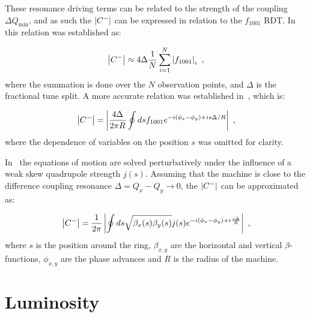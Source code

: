 These resonance driving terms can be related to the strength of the coupling \(\Delta Q_{\mathrm{min}}\), and as such the \(\left\lvert C^{-} \right\rvert\) can be expressed in relation to the \(f_{1001}\) RDT.
In~\cite{PHD:Franchi} this relation was established as:

\begin{equation}
    \left\lvert C^{-} \right\rvert \approx 4 \Delta \frac{1}{N} \sum_{i=1}^N \left\lvert f_{1001} \right\rvert_i \text{ ,}
    \label{equation:deltaqmin_from_f1001_franchi}
\end{equation}
where the summation is done over the \(N\) observation points, and \(\Delta\) is the fractional tune split.
A more accurate relation was established in~\cite{PRAB:Persson:Improved_Control_Betatron_Coupling}, which is:

\begin{equation}
    \left\lvert C^{-} \right\rvert = \left\lvert \frac{4 \Delta}{2 \pi R} \oint d s f_{1001} e^{-i \left(\phi_x - \phi_y \right) + i s \Delta / R}  \right\rvert \text{ ,}
    \label{equation:deltaqmin_from_f1001}
\end{equation}
where the dependence of variables on the position \(s\) was omitted for clarity.

In~\cite{PHREV:Guignard:Betatron_Coupling_Radiation} the equations of motion are solved perturbatively under the influence of a weak skew quadrupole strength \(j(s)\).
Assuming that the machine is close to the difference coupling resonance \(\Delta = Q_x - Q_y \rightarrow 0\), the \(\left\lvert C^{-} \right\rvert\) can be approximated as:

\begin{equation}
    \left\lvert C^{-} \right\rvert = \frac{1}{2 \pi} \left\lvert  \oint ds \sqrt{\beta_x(s) \beta_y(s)} j(s) e^{-i \left( \phi_x - \phi_y \right) + i \frac{s \Delta}{R}}  \right\rvert \text{ ,}
    \label{equation:deltaqmin_guignard}
\end{equation}
where \(s\) is the position around the ring, \(\beta_{x,y}\) are the horizontal and vertical \(\beta\)-functions, \(\phi_{x,y}\) are the phase advances and \(R\) is the radius of the machine.



\section{Luminosity}
\label{section:luminosity}

